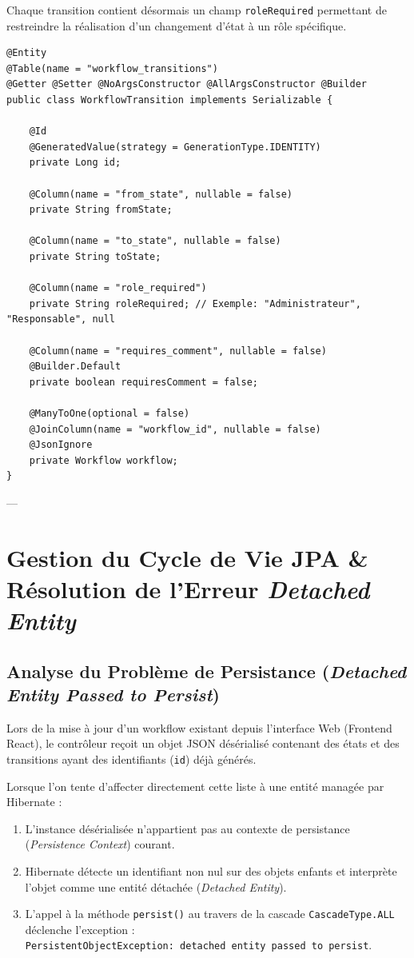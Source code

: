 \documentclass[11pt,a4paper]{article}
\begin{document}
Chaque transition contient désormais un champ \texttt{roleRequired} permettant de restreindre la réalisation d'un changement d'état à un rôle spécifique.

\begin{lstlisting}[language=CustomJava, caption={Entite WorkflowTransition avec restriction de role.}]
@Entity
@Table(name = "workflow_transitions")
@Getter @Setter @NoArgsConstructor @AllArgsConstructor @Builder
public class WorkflowTransition implements Serializable {

    @Id
    @GeneratedValue(strategy = GenerationType.IDENTITY)
    private Long id;

    @Column(name = "from_state", nullable = false)
    private String fromState;

    @Column(name = "to_state", nullable = false)
    private String toState;

    @Column(name = "role_required")
    private String roleRequired; // Exemple: "Administrateur", "Responsable", null

    @Column(name = "requires_comment", nullable = false)
    @Builder.Default
    private boolean requiresComment = false;

    @ManyToOne(optional = false)
    @JoinColumn(name = "workflow_id", nullable = false)
    @JsonIgnore
    private Workflow workflow;
}
\end{lstlisting}

---

\section{Gestion du Cycle de Vie JPA \& Résolution de l'Erreur \textit{Detached Entity}}

\subsection{Analyse du Problème de Persistance (\textit{Detached Entity Passed to Persist})}

Lors de la mise à jour d'un workflow existant depuis l'interface Web (Frontend React), le contrôleur reçoit un objet JSON désérialisé contenant des états et des transitions ayant des identifiants (\texttt{id}) déjà générés.

Lorsque l'on tente d'affecter directement cette liste à une entité managée par Hibernate :
\begin{enumerate}
    \item L'instance désérialisée n'appartient pas au contexte de persistance (\textit{Persistence Context}) courant.
    \item Hibernate détecte un identifiant non nul sur des objets enfants et interprète l'objet comme une entité détachée (\textit{Detached Entity}).
    \item L'appel à la méthode \texttt{persist()} au travers de la cascade \texttt{CascadeType.ALL} déclenche l'exception :\\
    \small\texttt{PersistentObjectException: detached entity passed to persist}.
\end{enumerate}
\end{document}
